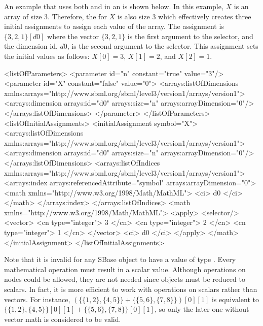 An example that uses both  and  in an \InitialAssignment is shown below.   In this example, $X$ is an array of size 3.  Therefore, the \InitialAssignment for $X$ is also size 3 which effectively creates three initial assignments to assign each value of the array.  The assignment is $\{ 3, 2, 1 \}[d0]$ where the vector $\{ 3, 2, 1 \}$ is the first argument to the selector, and the \InitialAssignment dimension id, $d0$, is the second argument to the selector.  This assignment sets the initial values as follows: $X[0]=3$, $X[1]=2$, and $X[2]=1$.
\begin{example}[showstringspaces=false]
<listOfParameters>
  <parameter id="n" constant="true" value="3"/>
  <parameter id="X" constant="false" value="0">
    <arrays:listOfDimensions xmlns:arrays="http://www.sbml.org/sbml/level3/version1/arrays/version1">
      <arrays:dimension arrays:id="d0" arrays:size="n" arrays:arrayDimension="0"/>
    </arrays:listOfDimensions>
  </parameter>
</listOfParameters>
<listOfInitialAssignments>
  <initialAssignment symbol="X">
    <arrays:listOfDimensions xmlns:arrays="http://www.sbml.org/sbml/level3/version1/arrays/version1">
      <arrays:dimension arrays:id="d0" arrays:size="n" arrays:arrayDimension="0"/>
    </arrays:listOfDimensions>
    <arrays:listOfIndices xmlns:arrays="http://www.sbml.org/sbml/level3/version1/arrays/version1">
      <arrays:index arrays:referencedAttribute="symbol" arrays:arrayDimension="0">
        <math xmlns="http://www.w3.org/1998/Math/MathML">            
          <ci> d0 </ci>
        </math>
      </arrays:index>
    </arrays:listOfIndices>
    <math xmlns="http://www.w3.org/1998/Math/MathML">        
      <apply>
        <selector/>
        <vector>
          <cn type="integer"> 3 </cn>
          <cn type="integer"> 2 </cn>
          <cn type="integer"> 1 </cn>
        </vector>
        <ci> d0 </ci>
      </apply>
    </math>
  </initialAssignment>
</listOfInitialAssignments>
\end{example}
Note that it is invalid for any SBase object to have a value of type .  Every mathematical operation must result in a scalar value.  Although operations on  nodes could be allowed, they are not needed since  objects must be reduced to scalars.  In fact, it is more efficient to work with operations on scalars rather than vectors. For instance, $(\{\{1,2\},\{4,5\}\}+\{\{5,6\},\{7,8\}\})[0][1]$ is equivalent to $\{\{1,2\},\{4,5\}\}[0][1] + \{\{5,6\},\{7,8\}\}[0][1]$, so only the later one without vector math is considered to be valid.
